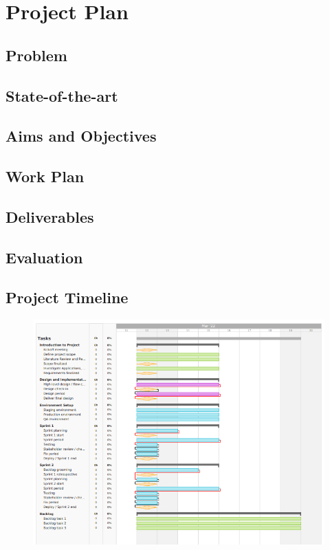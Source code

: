 \documentclass[12pt, a4paper]{report}
\begin{document}
\chapter{Project Plan}
\label{Chap1}
\section{Problem}
\section{State-of-the-art}
\section{Aims and Objectives}
\section{Work Plan}
\section{Deliverables}
\section{Evaluation}
\section{Project Timeline}
\begin{figure}[ht]%
\centering
\includegraphics[width=1\textwidth]{Figures/gantt_example.PNG}
\end{figure}
\end{document}
